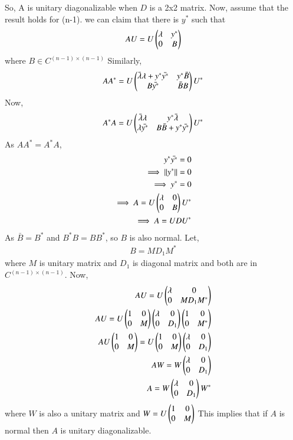 \documentclass[journal,12pt,twocolumn]{IEEEtran}
\renewcommand\thesection{\arabic{section}}
\begin{document}
So, A is unitary diagonalizable when $D$ is a 2x2 matrix.
Now, assume that the result holds for (n-1). we can claim that there is $y^*$ such that 
\begin{align}
AU = U\begin{pmatrix}\lambda & y^*\\0 & B\end{pmatrix}
\end{align}
where $B \in C^{(n-1)\times(n-1)}$
Similarly,
\begin{align}
A A^* =  U \begin{pmatrix}\bar{\lambda}\lambda + y^*\bar{y^*} & y^* \bar{B}\\B\bar{y^*} & \bar{B}B\end{pmatrix} U^*
\end{align}
Now,
\begin{align}
A^* A =  U \begin{pmatrix}\bar{\lambda}\lambda & y^* \bar{\lambda}\\\lambda\bar{y^*} & B\bar{B} + y^*\bar{y^*}\end{pmatrix} U^*
\end{align}
As $A A^* = A^* A$, 
\begin{align}
y^* \bar{y^*} = 0\\
\implies \left\lVert y^*\right\rVert = 0\\
\implies y^* =0\\
\implies A = U \begin{pmatrix}\lambda & 0\\0 & B\end{pmatrix} U^*\\
\implies A = U D U^*
\end{align}
As $\bar{B} = B^*$ and $B^* B = B B^*$, so $B$ is also normal.
Let, 
\begin{align}
B = M D_1 M^*
\end{align}
where $M$ is unitary matrix and $D_1$ is diagonal matrix and both are in $C^{(n-1)\times(n-1)}$.
Now,
\begin{align}
AU = U \begin{pmatrix}\lambda & 0\\0 & M D_1 M^*\end{pmatrix}\\
AU = U \begin{pmatrix}1 & 0\\0 & M\end{pmatrix}\begin{pmatrix}\lambda & 0\\0 & D_1\end{pmatrix}\begin{pmatrix}1 & 0\\0 & M^*\end{pmatrix}\\
AU\begin{pmatrix}1 & 0\\0 & M\end{pmatrix} = U \begin{pmatrix}1 & 0\\0 & M\end{pmatrix}\begin{pmatrix}\lambda & 0\\0 & D_1\end{pmatrix}\\
AW = W\begin{pmatrix}\lambda & 0\\0 & D_1\end{pmatrix}\\
A = W\begin{pmatrix}\lambda & 0\\0 & D_1\end{pmatrix}W^*
\end{align}
where $W$ is also a unitary matrix and $W=U\begin{pmatrix}1 & 0\\0 & M\end{pmatrix}$
This implies that if $A$ is normal then $A$ is unitary diagonalizable.
%
\end{document}
